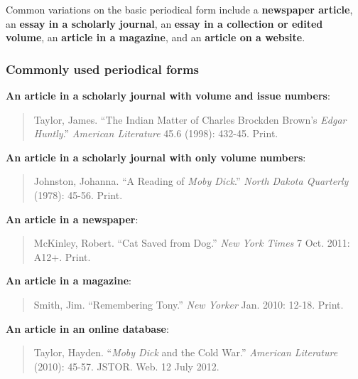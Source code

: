 Common variations on the basic periodical form include a \textbf{newspaper article}, an \textbf{essay in a scholarly journal}, an \textbf{essay in a collection or edited volume}, an \textbf{article in a magazine}, and an \textbf{article on a website}.

\subsubsection{Commonly used periodical forms}

\textbf{An article in a scholarly journal with volume and issue numbers}:
\begin{quote}
Taylor, James. ``The Indian Matter of Charles Brockden Brown's \emph{Edgar \tab Huntly}.'' \emph{American Literature} 45.6 (1998): 432-45. Print.
\end{quote}


\textbf{An article in a scholarly journal with only volume numbers}:
\begin{quote}
Johnston, Johanna. ``A Reading of \emph{Moby Dick}.'' \emph{North Dakota Quarterly}  (1978): 45-56. Print.
\end{quote}

\textbf{An article in a newspaper}:
\begin{quote}
McKinley, Robert. ``Cat Saved from Dog.'' \emph{New York Times} 7 Oct. 2011: \tab A12+. Print.
\end{quote}

\textbf{An article in a magazine}:
\begin{quote}
Smith, Jim. ``Remembering Tony.'' \emph{New Yorker} Jan. 2010: 12-18. Print.
\end{quote}

\textbf{An article in an online database}:
\begin{quote}
Taylor, Hayden. ``\emph{Moby Dick} and the Cold War.'' \emph{American Literature}  (2010): 45-57. 
JSTOR. Web. 12 July 2012.
\end{quote}

